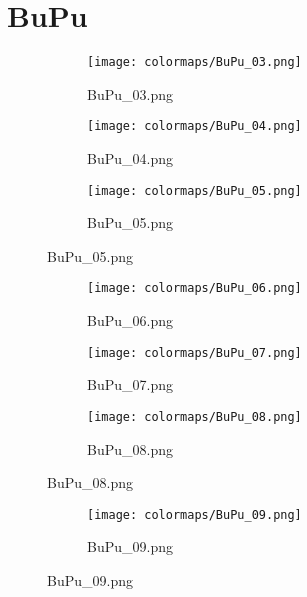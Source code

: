 \documentclass{article}%
\begin{document}
%
\newpage%
\section{BuPu}%
\label{sec:BuPu}%
\hspace{1cm}\hfill%
\hspace{1cm}\hfill%
\hspace{1cm}\hfill%


\begin{figure}[h!]%
\begin{subfigure}[b]{0.3\linewidth}%
\texttt{[image: colormaps/BuPu\_03.png]}%
\caption{BuPu\_03.png}%
\end{subfigure}%
\begin{subfigure}[b]{0.3\linewidth}%
\texttt{[image: colormaps/BuPu\_04.png]}%
\caption{BuPu\_04.png}%
\end{subfigure}%
\begin{subfigure}[b]{0.3\linewidth}%
\texttt{[image: colormaps/BuPu\_05.png]}%
\caption{BuPu\_05.png}%
\end{subfigure}%
\end{figure}

%
\hspace{1cm}\hfill%
\hspace{1cm}\hfill%
\hspace{1cm}\hfill%


\begin{figure}[h!]%
\begin{subfigure}[b]{0.3\linewidth}%
\texttt{[image: colormaps/BuPu\_06.png]}%
\caption{BuPu\_06.png}%
\end{subfigure}%
\begin{subfigure}[b]{0.3\linewidth}%
\texttt{[image: colormaps/BuPu\_07.png]}%
\caption{BuPu\_07.png}%
\end{subfigure}%
\begin{subfigure}[b]{0.3\linewidth}%
\texttt{[image: colormaps/BuPu\_08.png]}%
\caption{BuPu\_08.png}%
\end{subfigure}%
\end{figure}

%
\hspace{1cm}\hfill%


\begin{figure}[h!]%
\begin{subfigure}[b]{0.3\linewidth}%
\texttt{[image: colormaps/BuPu\_09.png]}%
\caption{BuPu\_09.png}%
\end{subfigure}%
\end{figure}
\end{document}
